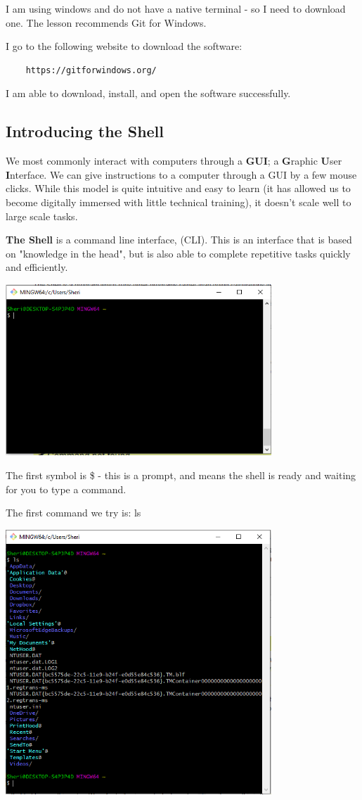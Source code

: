 \documentclass{article}
\begin{document}
I am using windows and do not have a native terminal - so I need to download one. The lesson recommends Git for Windows. 

I go to the following website to download the software:
\begin{verbatim}
    https://gitforwindows.org/
\end{verbatim}

I am able to download, install, and open the software successfully. 

\subsection{Introducing the Shell}

We most commonly interact with computers through a \textbf{GUI}; a \textbf{G}raphic \textbf{U}ser \textbf{I}nterface. We can give instructions to a computer through a GUI by a few mouse clicks. While this model is quite intuitive and easy to learn (it has allowed us to become digitally immersed with little technical training), it doesn't scale well to large scale tasks.  

\textbf{The Shell} is a command line interface, (CLI). This is an interface that is based on "knowledge in the head", but is also able to complete repetitive tasks quickly and efficiently.

\includegraphics[width=10cm]{Images/GitBash_001.PNG}


The first symbol is \$ - this is a prompt, and means the shell is ready and waiting for you to type a command. 

The first command we try is: ls

\includegraphics[width=10cm]{Images/GitBash_002.PNG}
\end{document}
